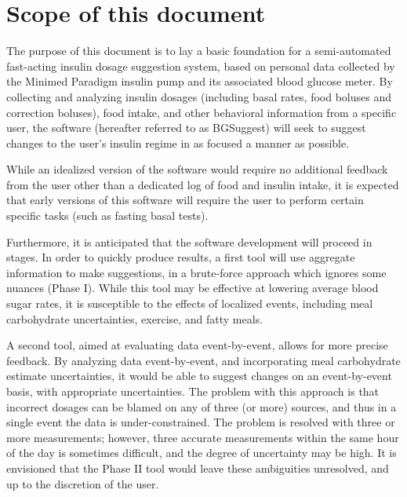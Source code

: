 



\def\hbac{\ensuremath{\text{HbA}_\text{1c}}}
\def\mgdl{\ensuremath{\text{mg/dL}}}
\def\sens{$\mgdl\over{U}$}
\def\carbratio{\ensuremath{R_\text{I-C}}}
\def\ric{\carbratio}
\def\rbas{\ensuremath{R_\text{Bas}}}



\thispagestyle{empty}
\section{Scope of this document}

The purpose of this document is to lay a basic foundation for a semi-automated fast-acting insulin 
dosage suggestion system, based on personal data collected by the Minimed Paradigm insulin pump and 
its associated blood glucose meter. By collecting and analyzing insulin dosages (including basal 
rates, food boluses and correction boluses), food intake, and other behavioral information from a 
specific user, the software (hereafter referred to as BGSuggest) will seek to suggest changes to 
the user's insulin regime in as focused a manner as possible.

While an idealized version of the software would require no additional feedback from the user other 
than a dedicated log of food and insulin intake, it is expected that early versions of this software 
will require the user to perform certain specific tasks (such as fasting basal tests).

Furthermore, it is anticipated that the software development will proceed in stages. In order to 
quickly produce results, a first tool will use aggregate information to make suggestions, in a 
brute-force approach which ignores some nuances (Phase I). While this tool may be effective at 
lowering average blood sugar rates, it is susceptible to the effects of localized events, including 
meal carbohydrate uncertainties, exercise, and fatty meals.

A second tool, aimed at evaluating data event-by-event, allows for more precise feedback. By 
analyzing data event-by-event, and incorporating meal carbohydrate estimate uncertainties, it would 
be able to suggest changes on an event-by-event basis, with appropriate uncertainties. The problem 
with this approach is that incorrect dosages can be blamed on any of three (or more) sources, and 
thus in a single event the data is under-constrained. The problem is resolved with three or more 
measurements; however, three accurate measurements within the same hour of the day is sometimes 
difficult, and the degree of uncertainty may be high. It is envisioned that the Phase II tool would 
leave these ambiguities unresolved, and up to the discretion of the user.

